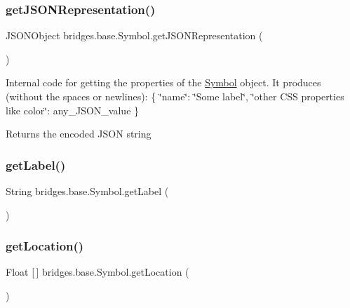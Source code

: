 \subsubsection{\texorpdfstring{getJSONRepresentation()}{getJSONRepresentation()}}
{\footnotesize\ttfamily J\+S\+O\+N\+Object bridges.\+base.\+Symbol.\+get\+J\+S\+O\+N\+Representation (\begin{DoxyParamCaption}{ }\end{DoxyParamCaption})}

Internal code for getting the properties of the \mbox{\hyperlink{classbridges_1_1base_1_1_symbol}{Symbol}} object. It produces (without the spaces or newlines)\+: \{ \char`\"{}name\char`\"{}\+: \char`\"{}\+Some label\char`\"{}, \char`\"{}other C\+S\+S properties like color\char`\"{}\+: any\+\_\+\+J\+S\+O\+N\+\_\+value \} \begin{DoxyReturn}{Returns}
the encoded J\+S\+ON string 
\end{DoxyReturn}
\mbox{\label{classbridges_1_1base_1_1_symbol_a7616c25b288a6e464f4f0b5fe4bd2826}} 
\subsubsection{\texorpdfstring{getLabel()}{getLabel()}}
{\footnotesize\ttfamily String bridges.\+base.\+Symbol.\+get\+Label (\begin{DoxyParamCaption}{ }\end{DoxyParamCaption})}

\mbox{\label{classbridges_1_1base_1_1_symbol_a73b96ca5cafe7da7b38aa7e7e57fc1d4}} 
\subsubsection{\texorpdfstring{getLocation()}{getLocation()}}
{\footnotesize\ttfamily Float \mbox{[}$\,$\mbox{]} bridges.\+base.\+Symbol.\+get\+Location (\begin{DoxyParamCaption}{ }\end{DoxyParamCaption})}

\mbox{\label{classbridges_1_1base_1_1_symbol_a0135a9633599ee1a463f7bd83c425d02}} 

